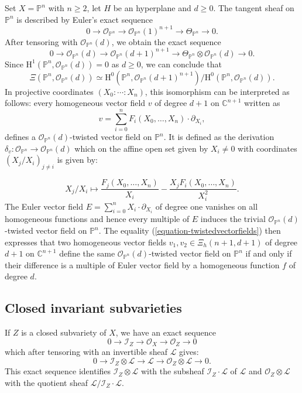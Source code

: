 \documentclass[12pt]{amsart}
\renewcommand{\O}{\mathcal{O}}
\renewcommand{\P}{\mathbb{P}}
\theoremstyle{definition}
\theoremstyle{plain}
\theoremstyle{exampstyle}
\theoremstyle{exampstyle}\newtheorem{thmxbis}{Theorem}
\numberwithin{equation}{section}
\theoremstyle{remark}
\begin{document}
{\example[Twisted algebraic vector fields on $\P^n$] \label{example-full-P^n} Set $X = \mathbb{P}^n$ with $n \geq 2$, let $H$ be an hyperplane and $d \geq 0$. The tangent sheaf on $\mathbb{P}^n$ is described by Euler's exact sequence 
$$ 0 \rightarrow \mathcal O_{\P^n} \rightarrow \mathcal O_{\P^n}(1)^{n+1} \rightarrow \Theta_{\P^n} \rightarrow 0.$$ 
After tensoring with $\mathcal O_{\P^n}(d)$, we obtain the exact sequence 
$$ 0 \rightarrow \mathcal O_{\P^n}(d) \rightarrow \mathcal O_{\P^n}(d+1)^{n+1} \rightarrow \Theta_{\P^n} \otimes \O_{\P^n}(d) \rightarrow 0.$$
Since $\mathrm{H}^1(\P^n, \mathcal O_{\P^n}(d)) = 0$ as $d \geq 0$, we can conclude that 
\begin{equation} \label{equation-twistedvectorfields}
\Xi(\P^n, \mathcal O_{\P^n}(d)) \simeq \mathrm{H}^0(\P^n, \mathcal O_{\P^n}(d+1)^{n+1} )/\mathrm{H}^0(\P^n, \mathcal O_{\P^n}(d)).
\end{equation}
In projective coordinates $(X_0: \cdots : X_n)$, this isomorphism can be interpreted as follows: every homogeneous vector field $v$ of degree $d +1$ on $\mathbb{C}^{n+1}$ written as
$$ v = \sum_{i = 0}^n F_i(X_0,\ldots,X_n) \cdot \partial_{X_i},$$
defines a $\mathcal O_{\P^n}(d)$-twisted vector field on $\mathbb{P}^n$. It is defined as the derivation $\delta_v: \mathcal O_{\P^n} \rightarrow \mathcal O_{\P^n}(d)$  which on the affine open set given by $X_i \neq 0$ with coordinates $(X_j/X_i)_{j \neq i}$ is given by:

\begin{equation}\label{equation-derivationassociated}
X_j/X_i \mapsto \frac{F_j(X_0,\ldots, X_n)} {X_i} -  \frac{X_j F_i(X_0,\ldots, X_n)} {X_i^2}.
\end{equation} 
The  Euler vector field $E = \sum_{i = 0}^n X_i \cdot \partial_{X_i}$
of degree one vanishes on all homogeneous functions and hence every multiple of $E$ induces the trivial $\mathcal O_{\P^n}(d)$-twisted vector field on $\mathbb{P}^n$. The equality (\ref{equation-twistedvectorfields}) then expresses that two homogeneous vector fields $v_1,v_2 \in \Xi_{h}(n+1,d + 1)$ of degree $d + 1$ on $\mathbb{C}^{n+1}$ define the same $\mathcal O_{\P^n}(d)$-twisted vector field on $\mathbb{P}^n$ if and only if their difference is a multiple of Euler vector field by a homogeneous function $f$ of degree $d$.}


\subsection{Closed invariant subvarieties} If $Z$ is a closed subvariety of $X$, we have an exact sequence
$$ 0 \rightarrow \mathcal I_Z \rightarrow \mathcal O_X \rightarrow \mathcal O_Z \rightarrow 0$$
which after tensoring with an invertible sheaf $\mathcal L$ gives: 
$$ 0 \rightarrow \mathcal I_Z \otimes \mathcal L \rightarrow \mathcal L \rightarrow \mathcal O_Z \otimes \mathcal L \rightarrow 0.$$
This exact sequence identifies $\mathcal I_Z \otimes \mathcal L$ with the subsheaf $\mathcal I_Z \cdot \mathcal L$ of $\mathcal L$ and $\mathcal O_Z \otimes \mathcal L$ with the quotient sheaf $\mathcal L / \mathcal I_Z \cdot \mathcal L$.
\end{document}
